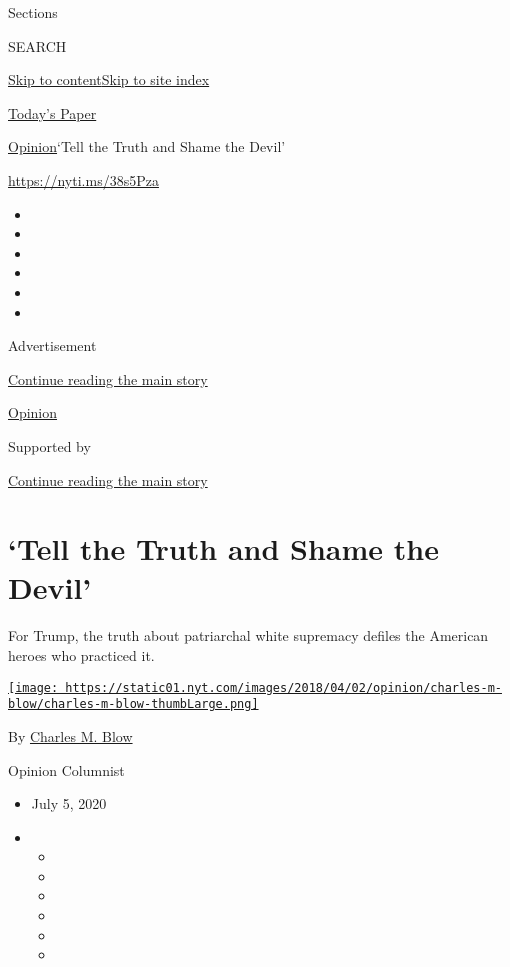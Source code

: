 Sections

SEARCH

\protect\hyperlink{site-content}{Skip to
content}\protect\hyperlink{site-index}{Skip to site index}

\href{https://myaccount.nytimes.com/auth/login?response_type=cookie\&client_id=vi}{}

\href{https://www.nytimes.com/section/todayspaper}{Today's Paper}

\href{/section/opinion}{Opinion}\textbar{}`Tell the Truth and Shame the
Devil'

\href{https://nyti.ms/38s5Pza}{https://nyti.ms/38s5Pza}

\begin{itemize}
\item
\item
\item
\item
\item
\item
\end{itemize}

Advertisement

\protect\hyperlink{after-top}{Continue reading the main story}

\href{/section/opinion}{Opinion}

Supported by

\protect\hyperlink{after-sponsor}{Continue reading the main story}

\hypertarget{tell-the-truth-and-shame-the-devil}{%
\section{`Tell the Truth and Shame the
Devil'}\label{tell-the-truth-and-shame-the-devil}}

For Trump, the truth about patriarchal white supremacy defiles the
American heroes who practiced it.

\href{https://www.nytimes.com/by/charles-m-blow}{\texttt{[image: https://static01.nyt.com/images/2018/04/02/opinion/charles-m-blow/charles-m-blow-thumbLarge.png]}}

By \href{https://www.nytimes.com/by/charles-m-blow}{Charles M. Blow}

Opinion Columnist

\begin{itemize}
\item
  July 5, 2020
\item
  \begin{itemize}
  \item
  \item
  \item
  \item
  \item
  \item
  \end{itemize}
\end{itemize}

